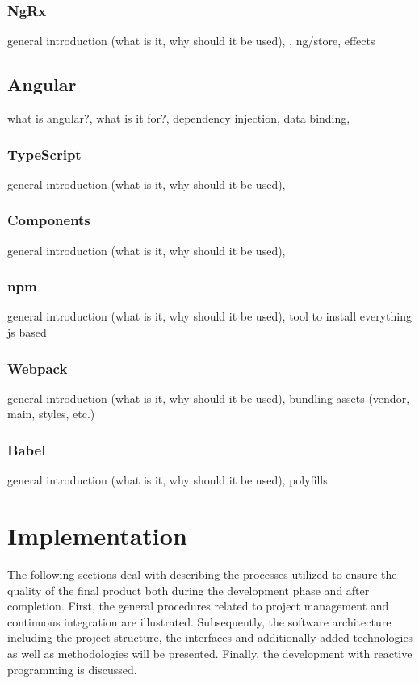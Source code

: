 \documentclass[Bachelor,BIF,english]{twbook}
\begin{document}
\subsection{NgRx}
general introduction (what is it, why should it be used), \cite{Ngrx}, ng/store, effects


\section{Angular}
what is angular?, what is it for?, dependency injection, data binding, \cite[p.~]{YakovFainAngular}

\subsection{TypeScript}
general introduction (what is it, why should it be used), 

\subsection{Components}
general introduction (what is it, why should it be used), 

\subsection{npm}
general introduction (what is it, why should it be used), 
tool to install everything js based

\subsection{Webpack}
general introduction (what is it, why should it be used), 
bundling assets (vendor, main, styles, etc.)

\subsection{Babel}
general introduction (what is it, why should it be used), 
polyfills

\clearpage 

\chapter{Implementation}
The following sections deal with describing the processes utilized to ensure the quality of the final product both during the development phase and after completion. First, the general procedures related to project management and continuous integration are illustrated. Subsequently, the software architecture including the project structure, the interfaces and additionally added technologies as well as methodologies will be presented. Finally, the development with reactive programming is discussed.
\end{document}
